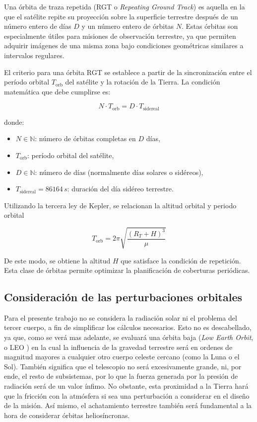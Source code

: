 Una órbita de traza repetida (RGT o \textit{Repeating Ground Track}) es aquella en la que el satélite repite su proyección sobre la superficie terrestre después de un número entero de días \( D \) y un número entero de órbitas \( N \). Estas órbitas son especialmente útiles para misiones de observación terrestre, ya que permiten adquirir imágenes de una misma zona bajo condiciones geométricas similares a intervalos regulares.

El criterio para una órbita RGT se establece a partir de la sincronización entre el período orbital \( T_{\mathrm{orb}} \) del satélite y la rotación de la Tierra. La condición matemática que debe cumplirse es:

\begin{equation}
N \cdot T_{\mathrm{orb}} = D \cdot T_{\mathrm{sidereal}}
\end{equation}

donde:
\begin{itemize}
    \item \( N \in \mathbb{N} \): número de órbitas completas en \( D \) días,
    \item \( T_{\mathrm{orb}} \): período orbital del satélite,
    \item \( D \in \mathbb{N} \): número de días (normalmente días solares o sidéreos),
    \item \( T_{\mathrm{sidereal}} = 86164 \, \si{s} \): duración del día sidéreo terrestre.
\end{itemize}


Utilizando la tercera ley de Kepler, se relacionan la altitud orbital y periodo orbital

\begin{equation}
T_{\mathrm{orb}} = 2\pi \sqrt{\frac{(R_T + H)^3}{\mu}}
\end{equation}

De este modo, se obtiene la altitud \( H \) que satisface la condición de repetición. Esta clase de órbitas permite optimizar la planificación de coberturas periódicas.



\subsection{Consideración de las perturbaciones orbitales}


Para el presente trabajo no se considera la radiación solar ni el problema del tercer cuerpo, a fin de simplificar los cálculos necesarios. Esto no es descabellado, ya que, como se verá mas adelante, se evaluará una órbita baja (\textit{Low Earth Orbit}, o LEO ) en la cual la influencia de la gravedad terrestre será en ordenes de magnitud mayores a cualquier otro cuerpo celeste cercano (como la Luna o el Sol). También significa que el telescopio no será excesivamente grande, ni, por ende, el resto de subsistemas, por lo que la fuerza generada por la presión de radiación será de un valor ínfimo. No obstante, esta proximidad a la Tierra hará que la fricción con la atmósfera si sea una perturbación a considerar en el diseño de la misión. Así mismo, el achatamiento terrestre también será fundamental a la hora de considerar órbitas heliosíncronas.